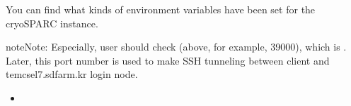 \documentclass[a4paper,10pt,english]{sphinxmanual}
\begin{document}
\sphinxAtStartPar
You can find what kinds of environment variables have been set for the cryoSPARC instance.

\begin{sphinxadmonition}{note}{Note:}
\sphinxAtStartPar
Especially, user should check  (above, for example, 39000), which is .
Later, this port number is used to make SSH tunneling between client and tem\sphinxhyphen{}cs\sphinxhyphen{}el7.sdfarm.kr login node.
\end{sphinxadmonition}
\begin{itemize}
\item {} 
\sphinxAtStartPar
{}

\end{itemize}
\end{document}
